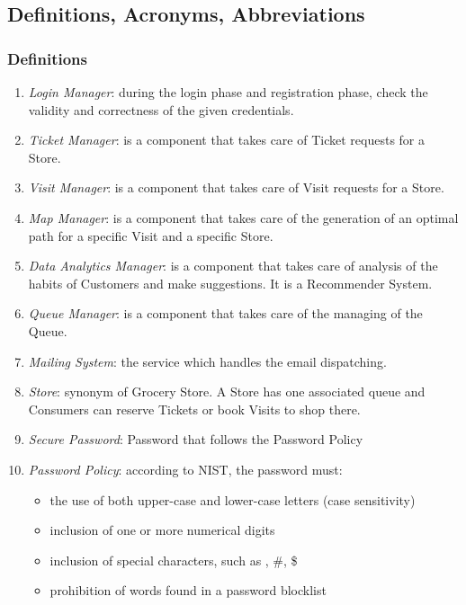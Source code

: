 \documentclass[a4paper, 12pt, oneside]{article}
\begin{document}
\subsection{Definitions, Acronyms, Abbreviations}

\subsubsection{Definitions}
\begin{enumerate}[label={D.\arabic{*}}]
\item \label{def:loginManager}\textit{Login Manager}: during the login phase and registration phase, check the validity and correctness of the given credentials.
\item \label{def:ticketManager}\textit{Ticket Manager}: 
is a component that takes care of Ticket requests for a Store.
\item \label{def:visitManager}\textit{Visit Manager}: is a component that takes care of Visit requests for a Store.
\item \label{def:mapManager}\textit{Map Manager}: is a component that takes care of the generation of an optimal path for a specific Visit and a specific Store.
\item \label{def:dataManager}\textit{Data Analytics Manager}: is a component that takes care of analysis of the habits of Customers and make suggestions. It is a Recommender System.
\item \label{def:queueManager}\textit{Queue Manager}: is a component that takes care of the managing of the Queue.
\item \label{def:mailing}\textit{Mailing System}: the service which handles the email dispatching.
\item \label{def:store}\textit{Store}: synonym of Grocery Store. A Store has one associated queue and Consumers can reserve Tickets or book Visits to shop there.
\item \label{def:securepass}\textit{Secure Password}: Password that follows the Password Policy
\item \label{def:passpolicy} \textit{Password Policy}: according to NIST, the password must:
\begin{itemize}
   \item the use of both upper-case and lower-case letters (case sensitivity)
    \item inclusion of one or more numerical digits
    \item inclusion of special characters, such as \@, \#, \$
    \item prohibition of words found in a password blocklist

\end{itemize}
\end{enumerate}
\end{document}
